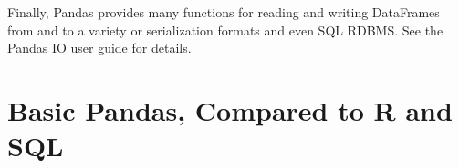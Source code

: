 
                   








Finally, Pandas provides many functions for reading and writing DataFrames from and to a variety or serialization formats and even SQL RDBMS. See the \href{https://pandas.pydata.org/docs/user_guide/io.html#}{Pandas IO user guide} for details. 

\section{Basic Pandas, Compared to R and SQL}

